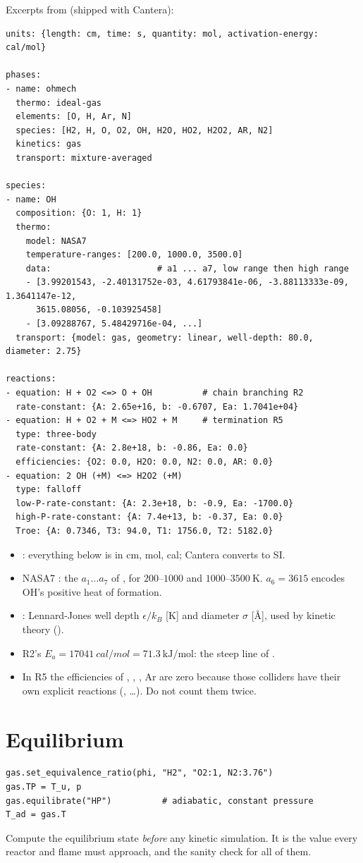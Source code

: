 Excerpts from  (shipped with Cantera):
\begin{lstlisting}[language={}]
units: {length: cm, time: s, quantity: mol, activation-energy: cal/mol}

phases:
- name: ohmech
  thermo: ideal-gas
  elements: [O, H, Ar, N]
  species: [H2, H, O, O2, OH, H2O, HO2, H2O2, AR, N2]
  kinetics: gas
  transport: mixture-averaged

species:
- name: OH
  composition: {O: 1, H: 1}
  thermo:
    model: NASA7
    temperature-ranges: [200.0, 1000.0, 3500.0]
    data:                     # a1 ... a7, low range then high range
    - [3.99201543, -2.40131752e-03, 4.61793841e-06, -3.88113333e-09, 1.3641147e-12,
      3615.08056, -0.103925458]
    - [3.09288767, 5.48429716e-04, ...]
  transport: {model: gas, geometry: linear, well-depth: 80.0, diameter: 2.75}

reactions:
- equation: H + O2 <=> O + OH          # chain branching R2
  rate-constant: {A: 2.65e+16, b: -0.6707, Ea: 1.7041e+04}
- equation: H + O2 + M <=> HO2 + M     # termination R5
  type: three-body
  rate-constant: {A: 2.8e+18, b: -0.86, Ea: 0.0}
  efficiencies: {O2: 0.0, H2O: 0.0, N2: 0.0, AR: 0.0}
- equation: 2 OH (+M) <=> H2O2 (+M)
  type: falloff
  low-P-rate-constant: {A: 2.3e+18, b: -0.9, Ea: -1700.0}
  high-P-rate-constant: {A: 7.4e+13, b: -0.37, Ea: 0.0}
  Troe: {A: 0.7346, T3: 94.0, T1: 1756.0, T2: 5182.0}
\end{lstlisting}
\begin{itemize}
  \item {}: everything below is in cm, mol, cal; Cantera converts to SI.
  \item NASA7 : the $a_1\dots a_7$ of , for $200$--$1000$ and $1000$--$\SI{3500}{\kelvin}$.
        $a_6=3615$ encodes OH's positive heat of formation.
  \item {}: Lennard-Jones well depth $\epsilon/k_B$ [K] and diameter $\sigma$ [\AA], used
        by kinetic theory ().
  \item R2's $E_a=\SI{17041}{cal/mol}=\SI{71.3}{\kilo\joule\per\mole}$: the steep line of .
  \item In R5 the efficiencies of , , , Ar are zero because those colliders have
        their own explicit reactions (, \dots). Do not count them twice.
\end{itemize}

\section{Equilibrium}
\label{sec:ct-equil}
\begin{lstlisting}
gas.set_equivalence_ratio(phi, "H2", "O2:1, N2:3.76")
gas.TP = T_u, p
gas.equilibrate("HP")          # adiabatic, constant pressure
T_ad = gas.T
\end{lstlisting}
\begin{keypoint}
Compute the equilibrium state \emph{before} any kinetic simulation. It is the value every reactor and
flame must approach, and the sanity check for all of them.
\end{keypoint}


